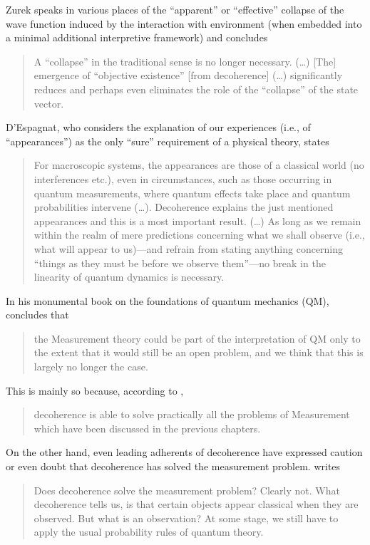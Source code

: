 \documentclass[twocolumn,rmp,aps,amsmath,amsfonts,noshowkeys,noshowpacs]{revtex4}
\begin{document}
%
Zurek speaks in various places of the ``apparent'' or ``effective''
collapse of the wave function induced by the interaction with
environment (when embedded into a minimal additional interpretive
framework) and concludes \citep[p.~1793]{Zurek:1998:re}
%
\begin{quote} {\small 
    A ``collapse'' in the traditional sense is no
    longer necessary.  (\dots) [The] emergence of ``objective
    existence'' [from decoherence] (\dots) significantly reduces and
    perhaps even eliminates the role of the ``collapse'' of the state
    vector.
}\end{quote}
%
D'Espagnat, who considers the explanation of our experiences (i.e., of
``appearances'') as the only ``sure'' requirement of a physical
theory, states \citep[p.~136]{Espagnat:2000:uy}
%
\begin{quote} {\small For macroscopic systems, the appearances are
    those of a classical world (no interferences etc.), even in
    circumstances, such as those occurring in quantum measurements,
    where quantum effects take place and quantum probabilities
    intervene (\dots).  Decoherence explains the just mentioned
    appearances and this is a most important result. (\dots) As long
    as we remain within the realm of mere predictions concerning what
    we shall observe (i.e., what will appear to us)---and refrain from
    stating anything concerning ``things as they must be before we
    observe them''---no break in the linearity of quantum dynamics is
    necessary.
}\end{quote}
%
In his monumental book on the foundations of quantum mechanics (QM),
\citet[p.~791]{Auletta:2000:rv} concludes that
%
\begin{quote} {\small
the Measurement theory could be part of the interpretation of QM only
to the extent that it would still be an open problem, and we think
that this is largely no longer the case.
}\end{quote}
%
This is mainly so because, according to
\citet[p.~289]{Auletta:2000:rv},
%
\begin{quote} {\small
decoherence is able to solve practically all the problems of
Measurement which have been discussed in the previous chapters.
}\end{quote}
%
On the other hand, even leading adherents of decoherence have
expressed caution or even doubt that decoherence has solved the
measurement problem.  \citet[p.~14]{Joos:1999:po} writes
%
\begin{quote} {\small Does decoherence solve the measurement problem?
    Clearly not. What decoherence tells us, is that certain objects
    appear classical when they are observed. But what is an
    observation? At some stage, we still have to apply the usual
    probability rules of quantum theory.
}\end{quote}
\end{document}
